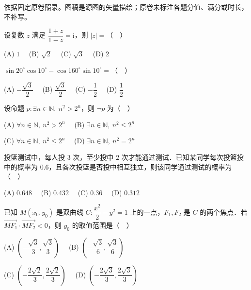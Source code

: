

\begin{gktip}
依据固定原卷照录。图稿是源图的矢量描绘；原卷未标注各题分值、满分或时长，不补写。
\end{gktip}


\begin{question}
设复数 $z$ 满足 $\dfrac{1+z}{1-z}=\mathrm{i}$，则 $|z|=$（　）

(A) $1$　 (B) $\sqrt2$　 (C) $\sqrt3$　 (D) $2$

\end{question}
\begin{question}
$\sin20^\circ\cos10^\circ-\cos160^\circ\sin10^\circ=$（　）

(A) $-\dfrac{\sqrt3}{2}$　 (B) $\dfrac{\sqrt3}{2}$　 (C) $-\dfrac12$　 (D) $\dfrac12$

\end{question}
\begin{question}
设命题 $p:\exists n\in\mathbb N,\ n^2>2^n$，则 $\neg p$ 为（　）

(A) $\forall n\in\mathbb N,\ n^2>2^n$　 (B) $\exists n\in\mathbb N,\ n^2\leqslant2^n$

(C) $\forall n\in\mathbb N,\ n^2\leqslant2^n$　 (D) $\exists n\in\mathbb N,\ n^2=2^n$

\end{question}
\begin{question}
投篮测试中，每人投 $3$ 次，至少投中 $2$ 次才能通过测试．已知某同学每次投篮投中的概率为 $0.6$，且各次投篮是否投中相互独立，则该同学通过测试的概率为（　）

(A) $0.648$　 (B) $0.432$　 (C) $0.36$　 (D) $0.312$

\end{question}
\begin{question}
已知 $M(x_0,y_0)$ 是双曲线 $C:\dfrac{x^2}{2}-y^2=1$ 上的一点，$F_1,F_2$ 是 $C$ 的两个焦点．若 $\overrightarrow{MF_1}\cdot\overrightarrow{MF_2}<0$，则 $y_0$ 的取值范围是（　）

(A) $\left(-\dfrac{\sqrt3}{3},\dfrac{\sqrt3}{3}\right)$　 (B) $\left(-\dfrac{\sqrt3}{6},\dfrac{\sqrt3}{6}\right)$

(C) $\left(-\dfrac{2\sqrt2}{3},\dfrac{2\sqrt2}{3}\right)$　 (D) $\left(-\dfrac{2\sqrt3}{3},\dfrac{2\sqrt3}{3}\right)$

\Needspace{0.4\textheight}
\end{question}
